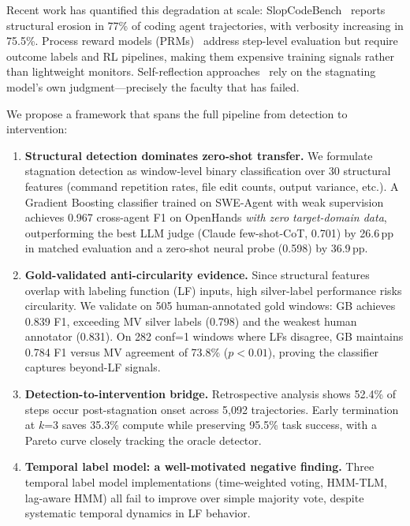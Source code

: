 \documentclass[11pt,a4paper]{article}
\begin{document}
Recent work has quantified this degradation at scale: SlopCodeBench~\cite{slopcodebench2026} reports structural erosion in 77\% of coding agent trajectories, with verbosity increasing in 75.5\%.
Process reward models (PRMs)~\cite{agentprm2026,prm_framework2025} address step-level evaluation but require outcome labels and RL pipelines, making them expensive training signals rather than lightweight monitors.
Self-reflection approaches~\cite{shinn2023reflexion,yao2023tree} rely on the stagnating model's own judgment---precisely the faculty that has failed.

We propose a framework that spans the full pipeline from detection to intervention:

\begin{enumerate}
\item \textbf{Structural detection dominates zero-shot transfer.}
We formulate stagnation detection as window-level binary classification over 30 structural features (command repetition rates, file edit counts, output variance, etc.).
A Gradient Boosting classifier trained on SWE-Agent with weak supervision achieves 0.967 cross-agent F1 on OpenHands \emph{with zero target-domain data}, outperforming the best LLM judge (Claude few-shot-CoT, 0.701) by 26.6\,pp in matched evaluation and a zero-shot neural probe (0.598) by 36.9\,pp.

\item \textbf{Gold-validated anti-circularity evidence.}
Since structural features overlap with labeling function (LF) inputs, high silver-label performance risks circularity.
We validate on 505 human-annotated gold windows: GB achieves 0.839 F1, exceeding MV silver labels (0.798) and the weakest human annotator (0.831).
On 282 conf=1 windows where LFs disagree, GB maintains 0.784 F1 versus MV agreement of 73.8\% ($p<0.01$), proving the classifier captures beyond-LF signals.

\item \textbf{Detection-to-intervention bridge.}
Retrospective analysis shows 52.4\% of steps occur post-stagnation onset across 5{,}092 trajectories.
Early termination at $k$=3 saves 35.3\% compute while preserving 95.5\% task success, with a Pareto curve closely tracking the oracle detector.

\item \textbf{Temporal label model: a well-motivated negative finding.}
Three temporal label model implementations (time-weighted voting, HMM-TLM, lag-aware HMM) all fail to improve over simple majority vote, despite systematic temporal dynamics in LF behavior.
\end{enumerate}
\end{document}
